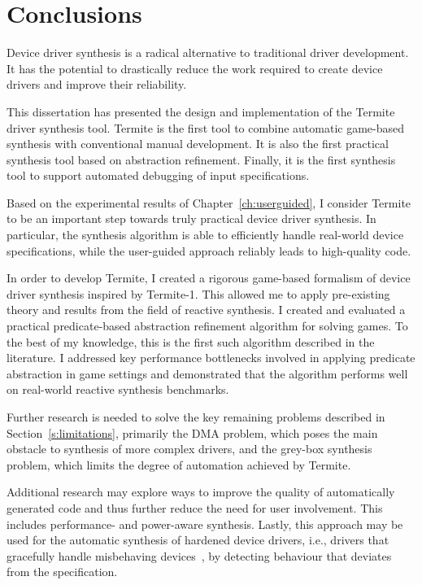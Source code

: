 \chapter{Conclusions}

Device driver synthesis is a radical alternative to traditional driver development. It has the potential to drastically reduce the work required to create device drivers and improve their reliability.

This dissertation has presented the design and implementation of the Termite driver synthesis tool. Termite is the first tool to combine automatic game-based synthesis with conventional manual development. It is also the first practical synthesis tool based on abstraction refinement. Finally, it is the first synthesis tool to support automated debugging of input specifications. 

Based on the experimental results of Chapter~\ref{ch:userguided}, I consider Termite to be an important step towards truly practical device driver synthesis.  In particular, the synthesis algorithm is able to efficiently handle real-world device specifications, while the user-guided approach reliably leads to high-quality code.

In order to develop Termite, I created a rigorous game-based formalism of device driver synthesis inspired by Termite-1. This allowed me to apply pre-existing theory and results from the field of reactive synthesis. I created and evaluated a practical predicate-based abstraction refinement algorithm for solving games. To the best of my knowledge, this is the first such algorithm described in the literature. I addressed key performance bottlenecks involved in applying predicate abstraction in game settings and demonstrated that the algorithm performs well on real-world reactive synthesis benchmarks. 

Further research is needed to solve the key remaining problems described in Section~\ref{s:limitations}, primarily the DMA problem, which poses the main obstacle to synthesis of more complex drivers, and the grey-box synthesis problem, which limits the degree of automation achieved by Termite. 

Additional research may explore ways to improve the quality of automatically generated code and thus further reduce the need for user involvement. This includes performance- and power-aware synthesis. Lastly, this approach may be used for the automatic synthesis of hardened device drivers, i.e., drivers that gracefully handle misbehaving devices~\cite{Kadav_RS_09}, by detecting behaviour that deviates from the specification.

